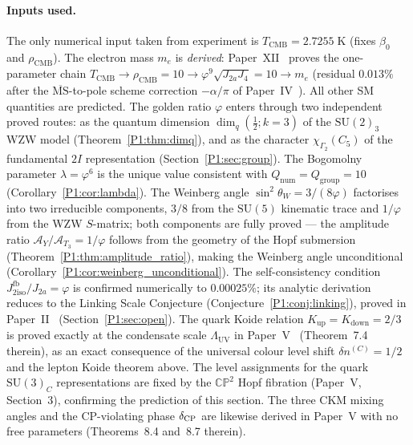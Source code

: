 \documentclass[11pt,a4paper]{article}
\theoremstyle{definition}
\theoremstyle{remark}
\newcommand{\vp}{\varphi}
\newcommand{\lam}{\lambda}
\newcommand{\bz}{\beta_{0}}
\newcommand{\Jfb}{J_{2\mathrm{iso}}^{\mathrm{fb}}}
\newcommand{\Ja}{J_{2a}}
\newcommand{\Jfour}{J_{4}}
\newcommand{\sinW}{\sin^{2}\!\theta_{W}}
\newcommand{\TCMB}{T_{\mathrm{CMB}}}
\newcommand{\rCMB}{\rho_{\mathrm{CMB}}}
\newcommand{\LUV}{\Lambda_{\mathrm{UV}}}
\begin{document}
\paragraph{Inputs used.}
The only numerical input taken from experiment is $\TCMB=2.7255\;\text{K}$
(fixes $\bz$ and $\rCMB$).  The electron mass $m_e$ is \emph{derived}:
Paper~XII~\cite{Paper12} proves the one-parameter chain
$\TCMB\to\rCMB=10\to\vp^9\sqrt{\Ja\Jfour}=10\to m_e$ (residual $0.013\%$
after the $\overline{\mathrm{MS}}$-to-pole scheme correction $-\alpha/\pi$
of Paper~IV~\cite{Paper4}).
All other SM quantities are predicted.  The golden ratio $\vp$ 
enters through two independent proved routes:
as the quantum dimension $\dim_q(\tfrac{1}{2};k{=}3)$ of the
$\mathrm{SU}(2)_3$ WZW model (Theorem~\ref{P1:thm:dimq}), and as the
character $\chi_{\Gamma_2}(C_5)$ of the fundamental $2I$ representation
(Section~\ref{P1:sec:group}).
The Bogomolny parameter $\lam=\vp^6$ is the unique value consistent with
$Q_{\mathrm{num}}=Q_{\mathrm{group}}=10$ (Corollary~\ref{P1:cor:lambda}).
The Weinberg angle $\sinW=3/(8\vp)$ factorises into two irreducible
components, $3/8$ from the $\mathrm{SU}(5)$ kinematic trace and $1/\vp$
from the WZW $S$-matrix; both components are fully proved ---
the amplitude ratio $\mathcal{A}_Y/\mathcal{A}_{T_3}=1/\vp$ follows
from the geometry of the Hopf submersion
(Theorem~\ref{P1:thm:amplitude_ratio}), making the Weinberg angle
unconditional (Corollary~\ref{P1:cor:weinberg_unconditional}).
The self-consistency condition $\Jfb/\Ja=\vp$ is confirmed numerically
to $0.00025\%$; its analytic derivation reduces to the Linking Scale
Conjecture (Conjecture~\ref{P1:conj:linking}), proved in
Paper~II~\cite{Paper2} (Section~\ref{P1:sec:open}). The quark Koide relation $K_{\mathrm{up}}=K_{\mathrm{down}}=2/3$ is proved
exactly at the condensate scale $\LUV$ in Paper~V~\cite{Paper5}
(Theorem~7.4 therein), as an exact consequence of the universal
colour level shift $\delta n^{(C)}=1/2$ and the lepton Koide
theorem above.  The level assignments for the quark $\mathrm{SU}(3)_C$
representations are fixed by the $\mathbb{CP}^2$ Hopf fibration
(Paper~V, Section~3), confirming the prediction of this section.
The three CKM mixing angles and the CP-violating phase $\delta_{\rm CP}$
are likewise derived in Paper~V with no free parameters
(Theorems~8.4 and~8.7 therein).
\end{document}
